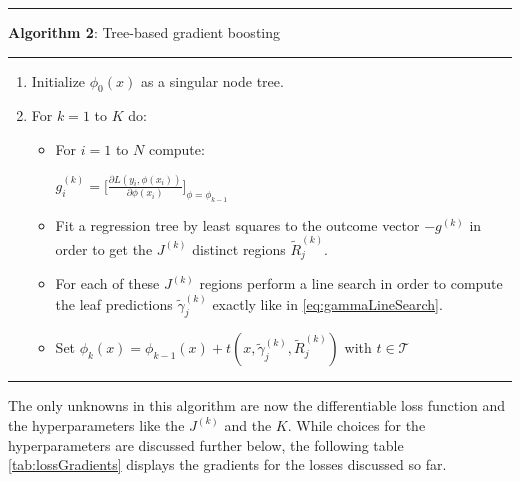 \documentclass[
]{book}
\begin{document}
\begin{center}\rule{0.5\linewidth}{0.5pt}\end{center}

\textbf{Algorithm 2}: Tree-based gradient boosting \citep{elements}

\begin{center}\rule{0.5\linewidth}{0.5pt}\end{center}

\begin{enumerate}
\def\labelenumi{\arabic{enumi}.}
\item
  Initialize \(\phi_0(x)\) as a singular node tree.
\item
  For \(k = 1\) to \(K\) do:

  \begin{itemize}
  \item
    For \(i = 1\) to \(N\) compute:

    \(g^{(k)}_{i} = \bigg[\frac{\partial L(y_i, \phi(x_i))}{\partial \phi(x_i)}\bigg]_{\phi = \phi_{k-1}}\)
  \item
    Fit a regression tree by least squares to the outcome vector \(-g^{(k)}\) in order to get the \(J^{(k)}\) distinct regions \(\tilde{R}^{(k)}_j\).
  \item
    For each of these \(J^{(k)}\) regions perform a line search in order to compute the leaf predictions \(\tilde{\gamma}^{(k)}_{j}\) exactly like in \eqref{eq:gammaLineSearch}.
  \item
    Set \(\phi_k(x) = \phi_{k-1}(x) + t(x,\tilde {\gamma}^{(k)}_{j},\tilde{R}^{(k)}_j)\) with \(t \in \mathcal{T}\)
  \end{itemize}
\end{enumerate}

\begin{center}\rule{0.5\linewidth}{0.5pt}\end{center}

The only unknowns in this algorithm are now the differentiable loss function and the hyperparameters like the \(J^{(k)}\) and the \(K\). While choices for the hyperparameters are discussed further below, the following table \ref{tab:lossGradients} displays the gradients for the losses discussed so far.
\end{document}
